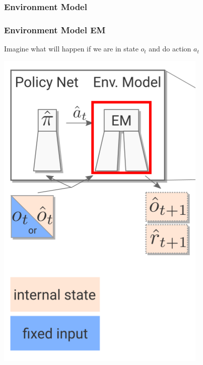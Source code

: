 \PraesentationMasterWeissBlau 
\begin{frame} 
    \frametitle{Environment Model}
\end{frame}

\PraesentationMasterStandard

\begin{frame}
    \frametitle{Environment Model EM}

\begin{multicols}{2}
	\begin{PraesentationAufzaehlung}
		\item Imagine what will happen if we are in state $o_t$ and do action $a_t$
	\end{PraesentationAufzaehlung}
    \vfill\columnbreak
	\begin{center}
    \includegraphics[height=0.5\textheight]{./Images/environment_model.png}%
	\end{center}
\end{multicols}
    
\end{frame}
\clearpage


